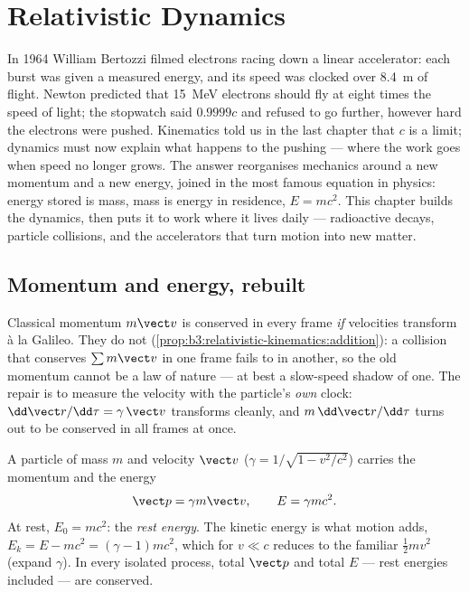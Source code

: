 \chapter{Relativistic Dynamics}\label{ch:b3:relativistic-dynamics}

In 1964 William Bertozzi filmed electrons racing down a linear
accelerator: each burst was given a measured energy, and its speed was
clocked over \qty{8.4}{m} of flight. Newton predicted that
\qty{15}{MeV} electrons should fly at eight times the speed of light;
the stopwatch said $0.9999c$ and refused to go further, however hard
the electrons were pushed. Kinematics told us in the last chapter that
$c$ is a limit; dynamics must now explain what happens to the pushing
--- where the work goes when speed no longer grows. The answer
reorganises mechanics around a new momentum and a new energy, joined
in the most famous equation in physics: energy stored is mass, mass is
energy in residence, $E = mc^2$. This chapter builds the dynamics,
then puts it to work where it lives daily --- radioactive decays,
particle collisions, and the accelerators that turn motion into new
matter.

\section{Momentum and energy, rebuilt}

\begin{remark}\label{rem:b3:relativistic-dynamics:why}
Classical momentum $m\vect v$ is conserved in every frame \emph{if}
velocities transform à la Galileo. They do not
(\cref{prop:b3:relativistic-kinematics:addition}): a collision that
conserves $\sum m\vect v$ in one frame fails to in another, so the
old momentum cannot be a law of nature --- at best a slow-speed
shadow of one. The repair is to measure the velocity with the
particle's \emph{own} clock: $\dd\vect r/\dd\tau =
\gamma\,\vect v$ transforms cleanly, and $m\,\dd\vect r/\dd\tau$
turns out to be conserved in all frames at once.
\end{remark}

\begin{definition}\label{def:b3:relativistic-dynamics:momentum-energy}
A particle of mass $m$ and velocity $\vect v$ ($\gamma = 1/\sqrt{1 -
v^2/c^2}$) carries the momentum and the energy
\[
\vect p = \gamma m\vect v , \qquad
E = \gamma mc^2 .
\]
At rest, $E_0 = mc^2$: the \emph{rest energy}. The kinetic energy is
what motion adds, $E_k = E - mc^2 = (\gamma - 1)mc^2$, which for $v
\ll c$ reduces to the familiar $\tfrac12 mv^2$ (expand $\gamma$). In
every isolated process, total $\vect p$ and total $E$ --- rest
energies included --- are conserved.
\end{definition}

